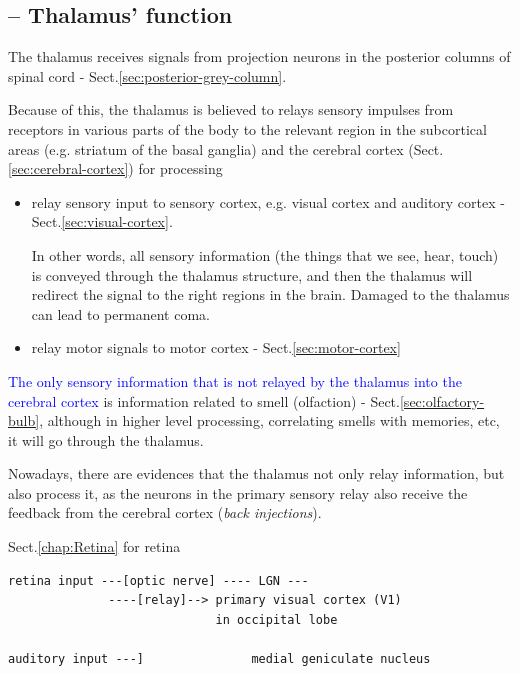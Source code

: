 \subsection{-- Thalamus' function}
\label{sec:thalamus-function}

The thalamus receives signals from projection neurons in the posterior columns
of spinal cord - Sect.\ref{sec:posterior-grey-column}.

Because of this, the thalamus is believed to relays sensory impulses from
receptors in various parts of the body to the relevant region in the
subcortical areas (e.g. striatum of the basal ganglia) and the cerebral
cortex (Sect.\ref{sec:cerebral-cortex}) for processing
\begin{itemize}
  \item relay sensory input to sensory cortex, e.g. visual cortex and auditory
  cortex - Sect.\ref{sec:visual-cortex}.

  In other words, all sensory information (the things that we see, hear, touch)
  is conveyed through the thalamus structure, and then the thalamus will
  redirect the signal to the right regions in the brain. Damaged to the thalamus
  can lead to permanent coma. 
  
  \item relay motor signals to motor cortex - Sect.\ref{sec:motor-cortex}


\end{itemize}
\textcolor{blue}{The only sensory information that is not relayed by the
thalamus into the cerebral cortex} is information related to smell (olfaction) -
Sect.\ref{sec:olfactory-bulb}, although in higher level processing, correlating
smells with memories, etc, it will go through the thalamus.

Nowadays, there are evidences that the thalamus not only relay information, but
also process it, as the neurons in the primary sensory relay also receive the
feedback from the cerebral cortex ({\it back injections}).

{\small Sect.\ref{chap:Retina} for retina
\begin{verbatim}
retina input ---[optic nerve] ---- LGN ---
              ----[relay]--> primary visual cortex (V1) 
                             in occipital lobe
              
auditory input ---]               medial geniculate nucleus 
\end{verbatim}
}

